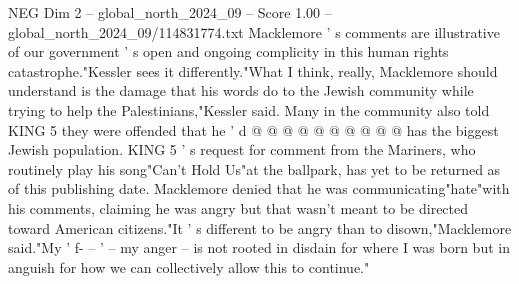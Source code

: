 \begin{textsample}{NEG Dim 2 – global\_north\_2024\_09 – Score 1.00 – global\_north\_2024\_09/114831774.txt}
Macklemore ' s comments are illustrative of our government ' s open and ongoing complicity in this human rights catastrophe."Kessler sees it differently."What I think, really, Macklemore should understand is the damage that his words do to the Jewish community while trying to help the Palestinians,"Kessler said.
Many in the community also told KING 5 they were offended that he ' d @ @ @ @ @ @ @ @ @ @ has the biggest Jewish population.
KING 5 ' s request for comment from the Mariners, who routinely play his song"Can't Hold Us"at the ballpark, has yet to be returned as of this publishing date.
Macklemore denied that he was communicating"hate"with his comments, claiming he was angry but that wasn't meant to be directed toward American citizens."It ' s different to be angry than to disown,"Macklemore said."My ' f- -- ' -- my anger -- is not rooted in disdain for where I was born but in anguish for how we can collectively allow this to continue."

\end{textsample}
